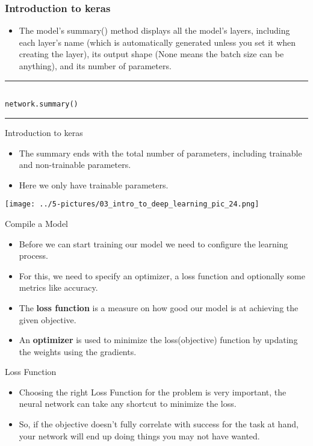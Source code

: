 \documentclass[11pt]{beamer}
\begin{document}
\begin{frame}[fragile]
\frametitle{Introduction to keras}

\begin{itemize}
\item The model’s summary() method displays all the model’s layers, including each layer’s name (which is automatically generated unless you set it when creating the layer), its output shape (None means the batch size can be anything), and its number of parameters. 
\end{itemize}
\rule{\textwidth}{1pt}
\scriptsize
\begin{verbatim}

network.summary()

\end{verbatim}
\rule{\textwidth}{1pt}
\end{frame}
\begin{frame}{Introduction to keras}
	\begin{itemize}
\item The summary ends with the total number of parameters, including trainable and non-trainable parameters. 
\item Here we only have trainable parameters.	
	\end{itemize}
	\begin{center}
	\texttt{[image: ../5-pictures/03\_intro\_to\_deep\_learning\_pic\_24.png]} 
	\end{center}
\end{frame}
\begin{frame}{Compile a Model}
	\begin{itemize}
		\item Before we can start training our model we need to configure the learning process. 
		\item For this, we need to specify an optimizer, a loss function and optionally some metrics like accuracy.
		\item The \textbf{loss function} is a measure on how good our model is at achieving the given objective.
		\item An \textbf{optimizer} is used to minimize the loss(objective) function by updating the weights using the gradients.
	\end{itemize}
\end{frame}
\begin{frame}{Loss Function}
	\begin{itemize}
		\item Choosing the right Loss Function for the problem is very important, the neural network can take any shortcut to minimize the loss. 
		\item So, if the objective doesn't fully correlate with success for the task at hand, your network will end up doing things you may not have wanted.
	\end{itemize}
\end{frame}
\end{document}
